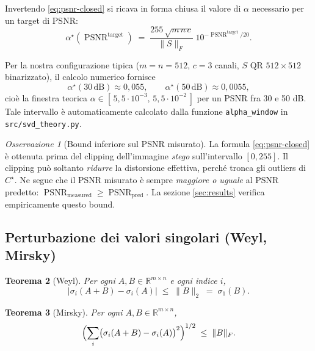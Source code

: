 \documentclass[11pt,a4paper]{article}
\newtheorem{theorem}{Teorema}
\theoremstyle{definition}
\theoremstyle{remark}
\newtheorem{remark}[theorem]{Osservazione}
\DeclareMathOperator{\PSNR}{PSNR}
\begin{document}
Invertendo \eqref{eq:psnr-closed} si ricava in forma chiusa il valore
di $\alpha$ necessario per un target di PSNR:
\begin{equation}\label{eq:alpha-target}
  \boxed{
   \alpha^{\star}(\PSNR^{\text{target}})
    \;=\; \frac{255\,\sqrt{m\,n\,c}}{\|S\|_F}\; 10^{-\PSNR^{\text{target}}/20}.
  }
\end{equation}

\noindent
Per la nostra configurazione tipica ($m=n=512$, $c=3$ canali, $S$ QR
$512\times 512$ binarizzato), il calcolo numerico fornisce
\[
   \alpha^{\star}(30\,\mathrm{dB}) \approx 0{,}055,
   \qquad
   \alpha^{\star}(50\,\mathrm{dB}) \approx 0{,}0055,
\]
cioè la finestra teorica $\alpha \in [\,5{,}5\!\cdot\!10^{-3},\, 5{,}5\!\cdot\!10^{-2}\,]$
per un PSNR fra 30 e 50 dB.  Tale intervallo è automaticamente
calcolato dalla funzione \texttt{alpha\_window} in
\verb|src/svd_theory.py|.

\begin{remark}[Bound inferiore sul PSNR misurato]
La formula \eqref{eq:psnr-closed} è ottenuta prima del clipping
dell'immagine \emph{stego} sull'intervallo $[0,255]$.  Il clipping può
soltanto \emph{ridurre} la distorsione effettiva, perché tronca gli
outliers di $C^{\star}$.  Ne segue che il PSNR misurato è sempre
\emph{maggiore o uguale} al PSNR predetto:
$\PSNR_{\text{measured}} \geq \PSNR_{\text{pred}}$.  La sezione
\ref{sec:results} verifica empiricamente questo bound.
\end{remark}

\subsection{Perturbazione dei valori singolari (Weyl, Mirsky)}
\label{sec:perturbation}

\begin{theorem}[Weyl]\label{thm:weyl}
Per ogni $A,B\in\mathbb{R}^{m\times n}$ e ogni indice $i$,
\begin{equation}\label{eq:weyl}
  \bigl| \sigma_i(A+B) - \sigma_i(A) \bigr| \;\leq\; \|B\|_2 \;=\; \sigma_1(B).
\end{equation}
\end{theorem}

\begin{theorem}[Mirsky]\label{thm:mirsky}
Per ogni $A,B\in\mathbb{R}^{m\times n}$,
\begin{equation}\label{eq:mirsky}
  \Bigl(\sum_i \bigl(\sigma_i(A+B)-\sigma_i(A)\bigr)^2\Bigr)^{1/2}
  \;\leq\; \|B\|_F.
\end{equation}
\end{theorem}
\end{document}
